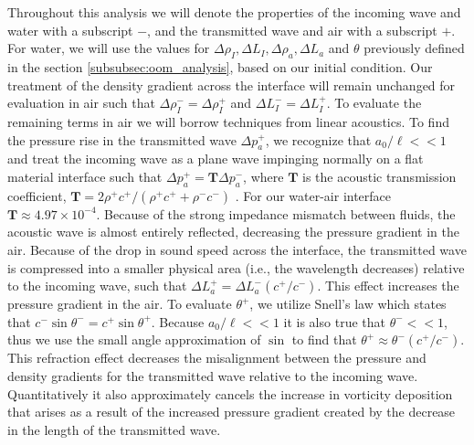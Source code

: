 \documentclass{article}
\newcommand{\bs}[1]{\boldsymbol{#1}}
\begin{document}
Throughout this analysis we will denote the properties of the incoming
wave and water with a subscript $-$, and the transmitted wave and air
with a subscript $+$. For water, we will use the values for
$\Delta \rho_I, \Delta L_I, \Delta \rho_a, \Delta L_a$ and $\theta$
previously defined in the section \ref{subsubsec:oom_analysis}, based
on our initial condition. Our treatment of the density gradient across
the interface will remain unchanged for evaluation in air such that
$\Delta \rho_I^-=\Delta \rho_I^+$ and $\Delta L_I^-=\Delta L_I^+$. To
evaluate the remaining terms in air we will borrow techniques from
linear acoustics. To find the pressure rise in the transmitted wave
$\Delta p_a^+$, we recognize that $a_0/\ell<<1$ and treat the
incoming wave as a plane wave impinging normally on a flat material
interface such that $\Delta p_a^+=\bs{T} \Delta p_a^-$, where $\bs{T}$
is the acoustic transmission coefficient,
$\bs{T}=2\rho^+ c^+/\left(\rho^+ c^+ + \rho^- c^- \right)$
\citep{Kinsler1982}. For our water-air interface
$\bs{T}\approx4.97\times10^{-4}$. Because of the strong impedance
mismatch between fluids, the acoustic wave is almost entirely
reflected, decreasing the pressure gradient in the air. Because of the
drop in sound speed across the interface, the transmitted wave is
compressed into a smaller physical area (i.e., the wavelength
decreases) relative to the incoming wave, such that
$\Delta L_a^+=\Delta L_a^- (c^+/c^-)$. This effect increases the
pressure gradient in the air. To evaluate $\theta^+$, we utilize
Snell's law which states that
$c^-\sin{\theta^-}=c^+\sin{\theta^+}$. Because $a_0/\ell<<1$ it is
also true that $\theta^-<<1$, thus we use the small angle
approximation of $\sin$ to find that
$\theta^+\approx\theta^-(c^+/c^-)$. This refraction effect decreases
the misalignment between the pressure and density gradients for the
transmitted wave relative to the incoming wave. Quantitatively it also
approximately cancels the increase in vorticity deposition that arises
as a result of the increased pressure gradient created by the decrease
in the length of the transmitted wave.
\end{document}
